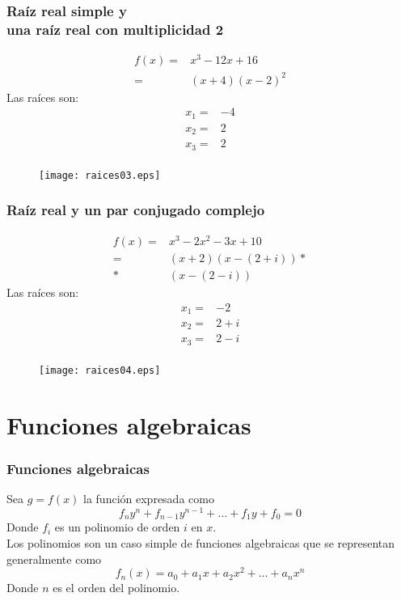 \documentclass[12pt]{beamer}
\begin{document}
\begin{frame}[fragile]
\frametitle{Ra\'{i}z real simple y \\ una ra\'{i}z real con multiplicidad 2}
\begin{minipage}{5cm}
\fontsize{12}{12}\selectfont
\[ \begin{split}
f(x)=& x^{3} - 12x + 16 \\
=& (x+4)(x-2)^{2}
\end{split} \]
Las ra\'{i}ces son:
\[ \begin{split}
x_{1} =& -4 \\
x_{2} =& 2 \\
x_{3} =& 2 \\
\end{split}\]
\end{minipage}
\hspace{0.5cm}
\begin{minipage}{4.5cm}
\begin{figure}
	\centering
	\texttt{[image: raices03.eps]} 
\end{figure}
\end{minipage}
\end{frame}
\begin{frame}[fragile]
\frametitle{Ra\'{i}z real y un par conjugado complejo}
\begin{minipage}{5cm}
\fontsize{12}{12}\selectfont
\[ \begin{split}
f(x)=& x^{3} - 2x^{2}- 3x +10  \\
=& (x+2)(x- (2+i))* {}\\
*& (x-(2-i))
\end{split} \]
Las ra\'{i}ces son:
\[ \begin{split}
x_{1} =& -2 \\
x_{2} =& 2+i \\
x_{3} =& 2-i \\
\end{split}\]
\end{minipage}
\hspace{0.5cm}
\begin{minipage}{4.5cm}
\begin{figure}
	\centering
	\texttt{[image: raices04.eps]} 
\end{figure}
\end{minipage}
\end{frame}
\section{Funciones algebraicas}
\begin{frame}
\frametitle{Funciones algebraicas}
Sea $g=f(x)$ la funci\'{o}n expresada como
\[ f_{n}y^{n} + f_{n-1}y^{n-1} + \ldots + f_{1}y + f_{0} = 0 \]
Donde $f_{i}$ es un polinomio de orden $i$ en $x$.
\\
\bigskip
Los polinomios son un caso simple de funciones algebraicas que se representan generalmente como
\[f_{n}(x) = a_{0} + a_{1}x + a_{2} x^{2}+ \ldots +a_{n}x^{n} \]
Donde $n$ es el orden del polinomio.
\end{frame}
\end{document}
